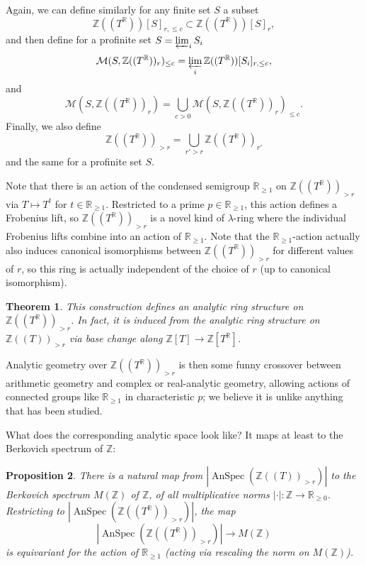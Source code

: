 \documentclass[11pt]{amsbook}
\DeclareMathOperator{\AnSpec}{AnSpec}
\numberwithin{equation}{section}
\newtheorem{theorem}{Theorem}
\numberwithin{theorem}{section}
\newtheorem{proposition}[theorem]{Proposition}
\theoremstyle{definition}
\begin{document}
Again, we can define similarly for any finite set $S$ a subset
\[
\mathbb Z((T^{\mathbb R}))[S]_{r,\leq c}\subset \mathbb Z((T^{\mathbb R}))[S]_r,
\]
and then define for a profinite set $S=\varprojlim_i S_i$
\[
\mathcal M(S,\mathbb Z((T^{\mathbb R}))_r)_{\leq c} = \varprojlim_i \mathbb Z((T^{\mathbb R}))[S_i]_{r,\leq c},
\]
and
\[
\mathcal M(S,\mathbb Z((T^{\mathbb R}))_r) = \bigcup_{c>0} \mathcal M(S,\mathbb Z((T^{\mathbb R}))_r)_{\leq c}.
\]
Finally, we also define
\[
\mathbb Z((T^{\mathbb R}))_{>r} = \bigcup_{r'>r} \mathbb Z((T^{\mathbb R}))_{r'}
\]
and the same for a profinite set $S$.

Note that there is an action of the condensed semigroup $\mathbb R_{\geq 1}$ on $\mathbb Z((T^{\mathbb R}))_{>r}$ via $T\mapsto T^t$ for $t\in \mathbb R_{\geq 1}$. Restricted to a prime $p\in \mathbb R_{\geq 1}$, this action defines a Frobenius lift, so $\mathbb Z((T^{\mathbb R}))_{>r}$ is a novel kind of $\lambda$-ring where the individual Frobenius lifts combine into an action of $\mathbb R_{\geq 1}$. Note that the $\mathbb R_{\geq 1}$-action actually also induces canonical isomorphisms between $\mathbb Z((T^{\mathbb R}))_{>r}$ for different values of $r$, so this ring is actually independent of the choice of $r$ (up to canonical isomorphism).

\begin{theorem} This construction defines an analytic ring structure on $\mathbb Z((T^{\mathbb R}))_{>r}$. In fact, it is induced from the analytic ring structure on $\mathbb Z((T))_{>r}$ via base change along $\mathbb Z[T]\to \mathbb Z[T^{\mathbb R}]$.
\end{theorem}

Analytic geometry over $\mathbb Z((T^{\mathbb R}))_{>r}$ is then some funny crossover between arithmetic geometry and complex or real-analytic geometry, allowing actions of connected groups like $\mathbb R_{\geq 1}$ in characteristic $p$; we believe it is unlike anything that has been studied.

What does the corresponding analytic space look like? It maps at least to the Berkovich spectrum of $\mathbb Z$:

\begin{proposition} There is a natural map from $|\AnSpec(\mathbb Z((T))_{>r})|$ to the Berkovich spectrum $M(\mathbb Z)$ of $\mathbb Z$, of all multiplicative norms $|\cdot|: \mathbb Z\to \mathbb R_{\geq 0}$. Restricting to $|\AnSpec(\mathbb Z((T^{\mathbb R}))_{>r})|$, the map
\[
|\AnSpec(\mathbb Z((T^{\mathbb R}))_{>r})|\to M(\mathbb Z)
\]
is equivariant for the action of $\mathbb R_{\geq 1}$ (acting via rescaling the norm on $M(\mathbb Z)$).
\end{proposition}
\end{document}
